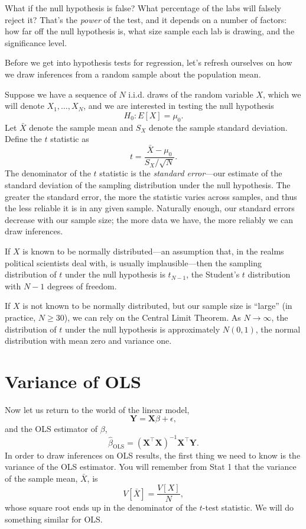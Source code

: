 \documentclass[12pt,oneside,openany]{book}
\begin{document}
What if the null hypothesis is false? What percentage of the labs will
falsely reject it? That's the \emph{power} of the test, and it depends
on a number of factors: how far off the null hypothesis is, what size
sample each lab is drawing, and the significance level.

Before we get into hypothesis tests for regression, let's refresh
ourselves on how we draw inferences from a random sample about the
population mean.

Suppose we have a sequence of \(N\) i.i.d. draws of the random variable
\(X\), which we will denote \(X_1, \ldots, X_N\), and we are interested
in testing the null hypothesis \[
H_0 : E[X] = \mu_0.
\] Let \(\bar{X}\) denote the sample mean and \(S_X\) denote the sample
standard deviation. Define the \(t\) statistic as \[
t = \frac{\bar{X} - \mu_0}{S_X / \sqrt{N}}.
\] The denominator of the \(t\) statistic is the \emph{standard
error}---our estimate of the standard deviation of the sampling
distribution under the null hypothesis. The greater the standard error,
the more the statistic varies across samples, and thus the less reliable
it is in any given sample. Naturally enough, our standard errors
decrease with our sample size; the more data we have, the more reliably
we can draw inferences.

If \(X\) is known to be normally distributed---an assumption that, in
the realms political scientists deal with, is usually implausible---then
the sampling distribution of \(t\) under the null hypothesis is
\(t_{N - 1}\), the Student's \(t\) distribution with \(N - 1\) degrees
of freedom.

If \(X\) is not known to be normally distributed, but our sample size is
``large'' (in practice, \(N \geq 30\)), we can rely on the Central Limit
Theorem. As \(N \to \infty\), the distribution of \(t\) under the null
hypothesis is approximately \(N(0, 1)\), the normal distribution with
mean zero and variance one.

\section{Variance of OLS}\label{variance-of-ols}

Now let us return to the world of the linear model, \[
\mathbf{Y} = \mathbf{X} \beta + \epsilon,
\] and the OLS estimator of \(\beta\), \[
\hat{\beta}_{\text{OLS}} = (\mathbf{X}^\top \mathbf{X})^{-1} \mathbf{X}^\top \mathbf{Y}.
\] In order to draw inferences on OLS results, the first thing we need
to know is the variance of the OLS estimator. You will remember from
Stat 1 that the variance of the sample mean, \(\bar{X}\), is \[
V[\bar{X}] = \frac{V[X]}{N},
\] whose square root ends up in the denominator of the \(t\)-test
statistic. We will do something similar for OLS.
\end{document}
